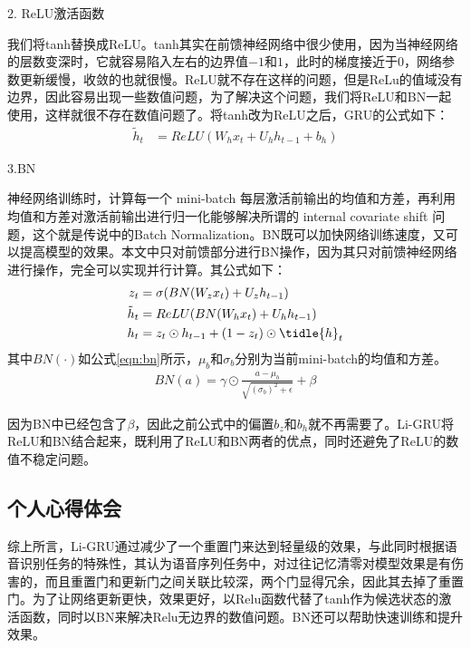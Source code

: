 2. ReLU激活函数

我们将tanh替换成ReLU。tanh其实在前馈神经网络中很少使用，因为当神经网络的层数变深时，它就容易陷入左右的边界值$-1$和$1$，此时的梯度接近于$0$，网络参数更新缓慢，收敛的也就很慢。ReLU就不存在这样的问题，但是ReLu的值域没有边界，因此容易出现一些数值问题，为了解决这个问题，我们将ReLU和BN一起使用，这样就很不存在数值问题了。将tanh改为ReLU之后，GRU的公式如下：
\begin{align}
\label{eqn:candi-h-no-reset-relu}
\tilde{h}_{t} &= ReLU(W_{h}x_{t}+U_{h}h_{t-1}+b_{h})
\end{align}

3.BN

神经网络训练时，计算每一个 mini-batch 每层激活前输出的均值和方差，再利用均值和方差对激活前输出进行归一化能够解决所谓的 internal covariate shift 问题，这个就是传说中的Batch Normalization。BN既可以加快网络训练速度，又可以提高模型的效果。本文中只对前馈部分进行BN操作，因为其只对前馈神经网络进行操作，完全可以实现并行计算。其公式如下：
\begin{align}
z_t &= \sigma(BN(W_{z}x_{t})+U_{z}h_{t-1}) \label{eqn:bn-up-gate} \\
\tilde{h}_{t} &= ReLU(BN(W_{h}x_{t})+U_{h}h_{t-1}) \label{bn-eqn:candi-h} \\
h_{t} &= z_{t}\odot{h_{t-1}} + (1-z_{t})\odot\tidle{h}_{t}  \label{eqn:bn-final-h}
\end{align}
其中$BN(\cdot)$如公式\ref{eqn:bn}所示，$\mu_{b}$和$\sigma_{b}$分别为当前mini-batch的均值和方差。
\begin{align}
\label{eqn:bn}
BN(a) = \gamma \odot \frac{a-\mu_{b}}{\sqrt{(\sigma_b)^{2}+\epsilon}} + \beta
\end{align}

因为BN中已经包含了$\beta$，因此之前公式中的偏置$b_z$和$b_h$就不再需要了。Li-GRU将ReLU和BN结合起来，既利用了ReLU和BN两者的优点，同时还避免了ReLU的数值不稳定问题。

\subsection{个人心得体会}
\label{sec:ligru-pers}
综上所言，Li-GRU通过减少了一个重置门来达到轻量级的效果，与此同时根据语音识别任务的特殊性，其认为语音序列任务中，对过往记忆清零对模型效果是有伤害的，而且重置门和更新门之间关联比较深，两个门显得冗余，因此其去掉了重置门。为了让网络更新更快，效果更好，以Relu函数代替了tanh作为候选状态的激活函数，同时以BN来解决Relu无边界的数值问题。BN还可以帮助快速训练和提升效果。

